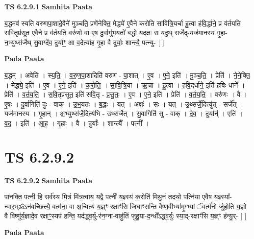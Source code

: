 \documentclass[17pt]{extarticle}
\begin{document}
\textbf{TS 6.2.9.1 } \newline
\textbf{Samhita Paata} \newline

ब॒द्धमव॑ स्यति वरुणपा॒शादे॒वैने॑ मुञ्चति॒ प्रणे॑नेक्ति॒ मेद्ध्ये॑ ए॒वैने॑ करोति सावित्रि॒यर्चा हु॒त्वा ह॑वि॒र्द्धाने॒ प्र व॑र्तयति सवि॒तृप्र॑सूत ए॒वैने॒ प्र व॑र्तयति॒ वरु॑णो॒ वा ए॒ष दु॒र्वागु॑भ॒यतो॑ ब॒द्धो यदक्षः॒ स यदु॒थ् सर्जे॒द्-यज॑मानस्य गृ॒हा-न॒भ्युथ्स॑र्जेथ् सु॒वाग्दे॑व॒ दुर्याꣳ॒॒ आ व॒देत्या॑ह गृ॒हा वै दुर्याः॒ शान्त्यै॒ पत्न्यु- [  ] \newline

\textbf{Pada Paata} \newline

ब॒द्धम् । अवेति॑ । स्य॒ति॒ । व॒रु॒ण॒पा॒शादिति॑ वरुण - पा॒शात् । ए॒व । ए॒ने॒ इति॑ । मु॒ञ्च॒ति॒ । प्रेति॑ । ने॒ने॒क्ति॒ । मेद्ध्ये॒ इति॑ । ए॒व । ए॒ने॒ इति॑ । क॒रो॒ति॒ । सा॒वि॒त्रि॒या । ऋ॒चा । हु॒त्वा । ह॒वि॒द्‌र्धाने॒ इति॑ हविः-धाने᳚ । प्रेति॑ । व॒र्त॒य॒ति॒ । स॒वि॒तृप्र॑सूत॒ इति॑ सवि॒तृ - प्र॒सू॒तः॒ । ए॒व । ए॒ने॒ इति॑ । प्रेति॑ । व॒र्त॒य॒ति॒ । वरु॑णः । वै । ए॒षः । दु॒र्वागिति॑ दुः - वाक् । उ॒भ॒यतः॑ । ब॒द्धः । यत् । अक्षः॑ । सः । यत् । उ॒थ्सर्जे॒दित्यु॑त् - सर्जे᳚त् । यज॑मानस्य । गृ॒हान् । अ॒भ्युथ्स॑र्जे॒दित्य॑भि - उथ्स॑र्जेत् । सु॒वागिति॑ सु - वाक् । दे॒व॒ । दुर्यान्॑ । एति॑ । व॒द॒ । इति॑ । आ॒ह॒ । गृ॒हाः । वै । दुर्याः᳚ । शान्त्यै᳚ । पत्नी᳚ ।  \newline




\section*{ TS 6.2.9.2 }

\textbf{TS 6.2.9.2 } \newline
\textbf{Samhita Paata} \newline

पा॑नक्ति॒ पत्नी॒ हि सर्व॑स्य मि॒त्रं मि॑त्र॒त्वाय॒ यद्वै पत्नी॑ य॒ज्ञ्स्य॑ क॒रोति॑ मिथु॒नं तदथो॒ पत्नि॑या ए॒वैष य॒ज्ञ्स्या᳚-न्वार॒भ्ॐऽन॑वच्छित्त्यै॒ वर्त्म॑ना॒ वा अ॒न्वित्य॑ य॒ज्ञ्ꣳ रक्षाꣳ॑सि जिघाꣳसन्ति वैष्ण॒वीभ्या॑मृ॒ग्भ्यां ॅवर्त्म॑नो र्जुहोति य॒ज्ञो वै विष्णु॑र्य॒ज्ञादे॒व रक्षाꣳ॒॒स्यप॑ हन्ति॒ यद॑द्ध्व॒र्यु-र॑न॒ग्ना-वाहु॑तिं जुहु॒या-द॒न्धो᳚ऽद्ध्व॒र्युः स्या॒द्-रक्षाꣳ॑सि य॒ज्ञ्ꣳ ह॑न्यु॒र्- [  ] \newline

\textbf{Pada Paata} \newline
\end{document}
